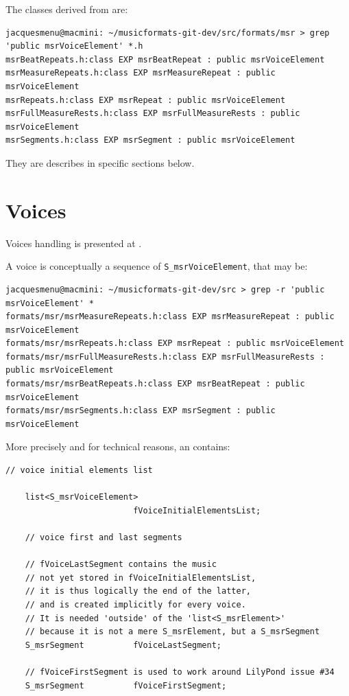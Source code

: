 The classes derived from  are:
\begin{lstlisting}[language=Terminal]
jacquesmenu@macmini: ~/musicformats-git-dev/src/formats/msr > grep 'public msrVoiceElement' *.h
msrBeatRepeats.h:class EXP msrBeatRepeat : public msrVoiceElement
msrMeasureRepeats.h:class EXP msrMeasureRepeat : public msrVoiceElement
msrRepeats.h:class EXP msrRepeat : public msrVoiceElement
msrFullMeasureRests.h:class EXP msrFullMeasureRests : public msrVoiceElement
msrSegments.h:class EXP msrSegment : public msrVoiceElement
\end{lstlisting}

They are describes in specific sections below.


\section{Voices}\label{Voices}

Voices handling is presented at .

A voice is conceptually a sequence of {\tt S_msrVoiceElement}, that may be:
\begin{lstlisting}[language=Terminal]
jacquesmenu@macmini: ~/musicformats-git-dev/src > grep -r 'public msrVoiceElement' *
formats/msr/msrMeasureRepeats.h:class EXP msrMeasureRepeat : public msrVoiceElement
formats/msr/msrRepeats.h:class EXP msrRepeat : public msrVoiceElement
formats/msr/msrFullMeasureRests.h:class EXP msrFullMeasureRests : public msrVoiceElement
formats/msr/msrBeatRepeats.h:class EXP msrBeatRepeat : public msrVoiceElement
formats/msr/msrSegments.h:class EXP msrSegment : public msrVoiceElement
\end{lstlisting}

More precisely and for technical reasons, an  contains:
\begin{lstlisting}[language=CPlusPlus]
    // voice initial elements list

    list<S_msrVoiceElement>
                          fVoiceInitialElementsList;

    // voice first and last segments

    // fVoiceLastSegment contains the music
    // not yet stored in fVoiceInitialElementsList,
    // it is thus logically the end of the latter,
    // and is created implicitly for every voice.
    // It is needed 'outside' of the 'list<S_msrElement>'
    // because it is not a mere S_msrElement, but a S_msrSegment
    S_msrSegment          fVoiceLastSegment;

    // fVoiceFirstSegment is used to work around LilyPond issue #34
    S_msrSegment          fVoiceFirstSegment;
\end{lstlisting}

